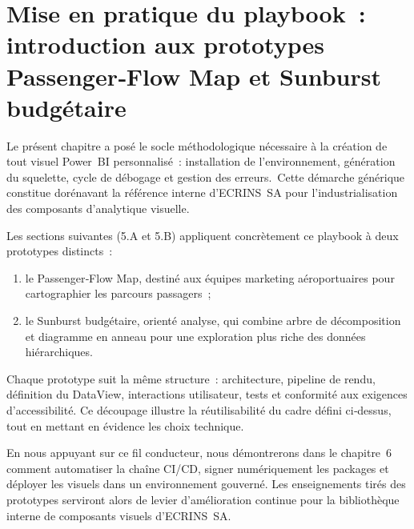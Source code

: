 
\section{Mise en pratique du playbook : introduction aux prototypes Passenger‑Flow Map et Sunburst budgétaire}

Le présent chapitre a posé le socle méthodologique nécessaire à la création de tout visuel Power BI personnalisé : installation de l’environnement, génération du squelette, cycle de débogage et gestion des erreurs. Cette démarche générique constitue dorénavant la référence interne d’ECRINS SA pour l’industrialisation des composants d’analytique visuelle.

Les sections suivantes (5.A et 5.B) appliquent concrètement ce playbook à deux prototypes distincts :

\begin{enumerate}
  \item le Passenger‑Flow Map, destiné aux équipes marketing aéroportuaires pour cartographier les parcours passagers ;
  \item le Sunburst budgétaire, orienté analyse, qui combine arbre de décomposition et diagramme en anneau pour une exploration plus riche des données hiérarchiques.
\end{enumerate}

Chaque prototype suit la même structure : architecture, pipeline de rendu, définition du DataView, interactions utilisateur, tests et conformité aux exigences d’accessibilité. Ce découpage illustre la réutilisabilité du cadre défini ci‑dessus, tout en mettant en évidence les choix technique.

En nous appuyant sur ce fil conducteur, nous démontrerons dans le chapitre 6 comment automatiser la chaîne CI/CD, signer numériquement les packages et déployer les visuels dans un environnement gouverné. Les enseignements tirés des prototypes serviront alors de levier d’amélioration continue pour la bibliothèque interne de composants visuels d’ECRINS SA.
